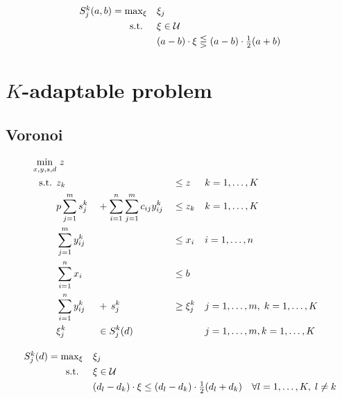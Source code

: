 \documentclass{article}
\newcommand{\uncset}{\mathcal{U}}
\newcommand{\uncparam}{\xi}
\newcommand{\snno}{n}
\newcommand{\sn}{i}
\newcommand{\dnno}{m}
\newcommand{\dn}{j}
\begin{document}
\begin{equation}
    \begin{array}{rl}
        S_j^k(a,b) = \max_\uncparam & \multicolumn{1}{l}{\uncparam_j} \\
        \text{s.t. } & \uncparam \in\uncset \\
                & (a-b)\cdot\uncparam \lesseqgtr (a-b)\cdot\frac{1}{2}(a+b)
    \end{array}
\end{equation}	

\section{$K$-adaptable problem}

\subsection{Voronoi}
\begin{align}
\arraycolsep=1.3pt\def\arraystretch{1.3}
 \displaystyle \min_{x,y,s,d}& \omit\rlap{ $z$}  \\
\textrm{s.t. } 	& z_k && &&\leq z && k=1,\dots,K \\
                & p\sum\limits_{\dn=1}^\dnno s_\dn^k &&+ \sum\limits_{\sn=1}^\snno\sum\limits_{\dn=1}^\dnno c_{\sn\dn}y_{\sn\dn}^k && \leq z_k &&k=1,\dots,K\\
				& \sum\limits_{\dn=1}^\dnno y_{\sn\dn}^k && 	&& \leq x_\sn 	&&\sn=1,\dots,\snno \\
                & \sum\limits_{\sn=1}^\snno x_\sn &&	&& \leq b && \\
                & \sum\limits_{\sn=1}^\snno y_{\sn\dn}^k &&+\, s_\dn^k &&\geq  \uncparam_\dn^k && \dn=1,\dots,\dnno,\; k=1,\dots,K \\
                &\uncparam_j^k && \in S_j^k(d) && && \dn=1,\dots,\dnno, k=1,\dots,K
\end{align}

\begin{equation}
    \begin{array}{rl}
        S_j^k(d) = \max_\uncparam & \multicolumn{1}{l}{\uncparam_j} \\
        \text{s.t. } & \uncparam \in\uncset \\
                & (d_l-d_k)\cdot\uncparam \leq (d_l-d_k)\cdot\frac{1}{2}(d_l+d_k)\quad \forall l=1,\dots,K,\; l\neq k
    \end{array}
\end{equation}	
\end{document}
